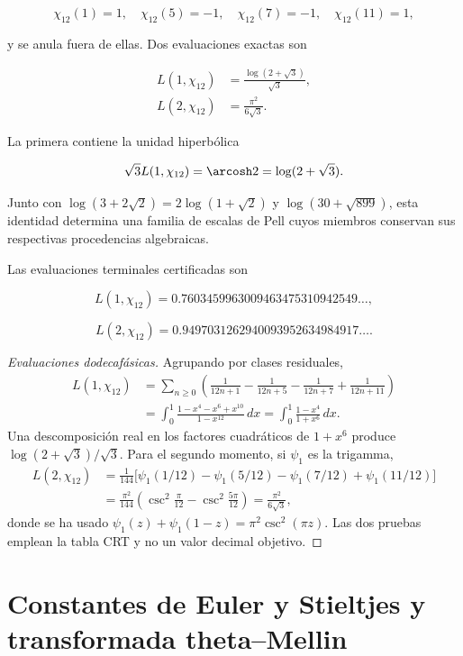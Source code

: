 \[
\chi_{12}(1)=1,\quad
\chi_{12}(5)=-1,\quad
\chi_{12}(7)=-1,\quad
\chi_{12}(11)=1,
\]

y se anula fuera de ellas. Dos evaluaciones exactas son

\begin{align}
L(1,\chi_{12})&=\frac{\log(2+\sqrt3)}{\sqrt3},
\label{p3-83-c33-s1:eq:L1chi12}\\
L(2,\chi_{12})&=\frac{\pi^2}{6\sqrt3}.
\label{p3-83-c33-s1:eq:L2chi12}
\end{align}

La primera contiene la unidad hiperb\'olica

\begin{equation}
\sqrt3L(1,\chi_{12})=\arcosh2=\log(2+\sqrt3).
\label{p3-83-c33-s1:eq:pell2}
\end{equation}

Junto con \(\log(3+2\sqrt2)=2\log(1+\sqrt2)\) y
\(\log(30+\sqrt{899})\), esta identidad determina una familia de escalas
de Pell cuyos miembros conservan sus respectivas procedencias algebraicas.

Las evaluaciones terminales certificadas son

\[
L(1,\chi_{12})=0.7603459963009463475310942549\ldots,
\]

\[
L(2,\chi_{12})=0.9497031262940093952634984917\ldots.
\]

\begin{proof}[Evaluaciones dodecaf\'asicas]
Agrupando por clases residuales,
\begin{align*}
L(1,\chi_{12})
&=\sum_{n\ge0}\left(
\frac1{12n+1}-\frac1{12n+5}
-\frac1{12n+7}+\frac1{12n+11}\right)\\
&=\int_0^1
\frac{1-x^4-x^6+x^{10}}{1-x^{12}}\,dx
=\int_0^1\frac{1-x^4}{1+x^6}\,dx.
\end{align*}
Una descomposici\'on real en los factores cuadr\'aticos de \(1+x^6\)
produce
\(\log(2+\sqrt3)/\sqrt3\). Para el segundo momento, si
\(\psi_1\) es la trigamma,
\begin{align*}
L(2,\chi_{12})
&=\frac1{144}\bigl[
\psi_1(1/12)-\psi_1(5/12)
-\psi_1(7/12)+\psi_1(11/12)\bigr]\\
&=\frac{\pi^2}{144}\left(
\csc^2\frac\pi{12}-\csc^2\frac{5\pi}{12}\right)
=\frac{\pi^2}{6\sqrt3},
\end{align*}
donde se ha usado
\(\psi_1(z)+\psi_1(1-z)=\pi^2\csc^2(\pi z)\). Las dos pruebas emplean
la tabla CRT y no un valor decimal objetivo.
\end{proof}


\section{Constantes de Euler y Stieltjes y transformada theta--Mellin}

